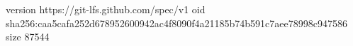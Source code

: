 version https://git-lfs.github.com/spec/v1
oid sha256:caa5cafa252d678952600942ac4f8090f4a21185b74b591c7aee78998c947586
size 87544
